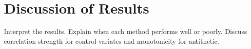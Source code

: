 \section{Discussion of Results}

Interpret the results. Explain when each method performs well or poorly. Discuss correlation strength for control variates and monotonicity for antithetic.

